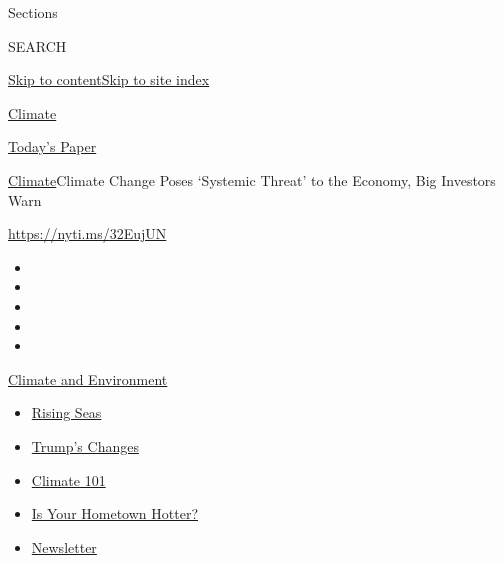 Sections

SEARCH

\protect\hyperlink{site-content}{Skip to
content}\protect\hyperlink{site-index}{Skip to site index}

\href{https://www.nytimes3xbfgragh.onion/section/climate}{Climate}

\href{https://myaccount.nytimes3xbfgragh.onion/auth/login?response_type=cookie\&client_id=vi}{}

\href{https://www.nytimes3xbfgragh.onion/section/todayspaper}{Today's
Paper}

\href{/section/climate}{Climate}\textbar{}Climate Change Poses `Systemic
Threat' to the Economy, Big Investors Warn

\url{https://nyti.ms/32EujUN}

\begin{itemize}
\item
\item
\item
\item
\item
\end{itemize}

\href{https://www.nytimes3xbfgragh.onion/section/climate?action=click\&pgtype=Article\&state=default\&region=TOP_BANNER\&context=storylines_menu}{Climate
and Environment}

\begin{itemize}
\tightlist
\item
  \href{https://www.nytimes3xbfgragh.onion/2020/07/30/climate/sea-level-inland-floods.html?action=click\&pgtype=Article\&state=default\&region=TOP_BANNER\&context=storylines_menu}{Rising
  Seas}
\item
  \href{https://www.nytimes3xbfgragh.onion/interactive/2020/climate/trump-environment-rollbacks.html?action=click\&pgtype=Article\&state=default\&region=TOP_BANNER\&context=storylines_menu}{Trump's
  Changes}
\item
  \href{https://www.nytimes3xbfgragh.onion/interactive/2020/04/19/climate/climate-crash-course-1.html?action=click\&pgtype=Article\&state=default\&region=TOP_BANNER\&context=storylines_menu}{Climate
  101}
\item
  \href{https://www.nytimes3xbfgragh.onion/interactive/2018/08/30/climate/how-much-hotter-is-your-hometown.html?action=click\&pgtype=Article\&state=default\&region=TOP_BANNER\&context=storylines_menu}{Is
  Your Hometown Hotter?}
\item
  \href{https://www.nytimes3xbfgragh.onion/newsletters/climate-change?action=click\&pgtype=Article\&state=default\&region=TOP_BANNER\&context=storylines_menu}{Newsletter}
\end{itemize}

